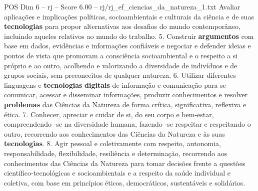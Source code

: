 \begin{textsample}{POS Dim 6 – rj – Score 6.00 – rj/rj\_ef\_ciencias\_da\_natureza\_1.txt}
Avaliar aplicações e implicações políticas, socioambientais e culturais da ciência e de suas \textbf{tecnologias} para propor alternativas aos desafios do mundo contemporâneo, incluindo aqueles relativos ao mundo do trabalho. 5.
Construir \textbf{argumentos} com base em dados, evidências e informações confiáveis e negociar e defender ideias e pontos de vista que promovam a consciência socioambiental e o respeito a si próprio e ao outro, acolhendo e valorizando a diversidade de indivíduos e de grupos sociais, sem preconceitos de qualquer natureza. 6.
Utilizar diferentes linguagens e \textbf{tecnologias} \textbf{digitais} de informação e comunicação para se comunicar, acessar e disseminar informações, produzir conhecimentos e resolver \textbf{problemas} das Ciências da Natureza de forma crítica, significativa, reflexiva e ética. 7.
Conhecer, apreciar e cuidar de si, do seu corpo e bem-estar, compreendendo -se na diversidade humana, fazendo -se respeitar e respeitando o outro, recorrendo aos conhecimentos das Ciências da Natureza e às suas \textbf{tecnologias}. 8.
Agir pessoal e coletivamente com respeito, autonomia, responsabilidade, flexibilidade, resiliência e determinação, recorrendo aos conhecimentos das Ciências da Natureza para tomar decisões frente a questões científico-tecnológicas e socioambientais e a respeito da saúde individual e coletiva, com base em princípios éticos, democráticos, sustentáveis e solidários.

\end{textsample}
